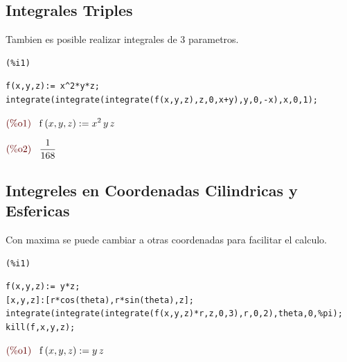 \documentclass[12pt]{article}
\begin{document}
\subsection{Integrales Triples}
Tambien es posible realizar integrales de 3 parametros.

\noindent
\begin{minipage}[t]{8ex}{\color{red}\bf
\begin{verbatim}
(%i1) 
\end{verbatim}}
\end{minipage}
\begin{minipage}[t]{\textwidth}{\color{blue}
\begin{verbatim}
f(x,y,z):= x^2*y*z;
integrate(integrate(integrate(f(x,y,z),z,0,x+y),y,0,-x),x,0,1);
\end{verbatim}}
\end{minipage}
\begin{math}\displaystyle
\parbox{8ex}{\color{labelcolor}(\%o1) }
\mathrm{f}\left( x,y,z\right) :={x}^{2}\,y\,z
\end{math}

\begin{math}\displaystyle
\parbox{8ex}{\color{labelcolor}(\%o2) }
\frac{1}{168}
\end{math}

\subsection{Integreles en Coordenadas Cilindricas y Esfericas}
Con maxima se puede cambiar a otras coordenadas para facilitar el calculo.

\noindent
\begin{minipage}[t]{8ex}{\color{red}\bf
\begin{verbatim}
(%i1) 
\end{verbatim}}
\end{minipage}
\begin{minipage}[t]{\textwidth}{\color{blue}
\begin{verbatim}
f(x,y,z):= y*z;
[x,y,z]:[r*cos(theta),r*sin(theta),z];
integrate(integrate(integrate(f(x,y,z)*r,z,0,3),r,0,2),theta,0,%pi);
kill(f,x,y,z);
\end{verbatim}}
\end{minipage}
\begin{math}\displaystyle
\parbox{8ex}{\color{labelcolor}(\%o1) }
\mathrm{f}\left( x,y,z\right) :=y\,z
\end{math}
\end{document}
